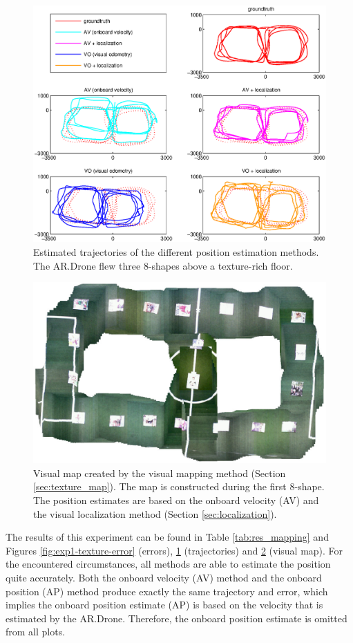 \begin{figure}[htb!]
\centering
\includegraphics[width=\linewidth,trim=2cm 1.5cm 2cm 2cm]{images/exp1-run13-path.eps}
\caption{Estimated trajectories of the different position estimation methods. The AR.Drone flew three 8-shapes above a texture-rich floor.}
\label{fig:exp1-texture-path}
\end{figure}

\begin{figure}[htb!]
\centering
\includegraphics[width=0.75\linewidth]{images/exp1-run13-map.jpg}
\caption{Visual map created by the visual mapping method (Section \ref{sec:texture_map}). The map is constructed during the first 8-shape. The position estimates are based on the onboard velocity (AV) and the visual localization method (Section \ref{sec:localization}).}
\label{fig:exp1-texture-map}
\end{figure}

The results of this experiment can be found in Table \ref{tab:res_mapping} and Figures \ref{fig:exp1-texture-error} (errors), \ref{fig:exp1-texture-path} (trajectories) and \ref{fig:exp1-texture-map} (visual map).
For the encountered circumstances, all methods are able to estimate the position quite accurately.
Both the onboard velocity (AV) method and the onboard position (AP) method produce exactly the same trajectory and error, which implies the onboard position estimate (AP) is based on the velocity that is estimated by the AR.Drone.
Therefore, the onboard position estimate is omitted from all plots.

